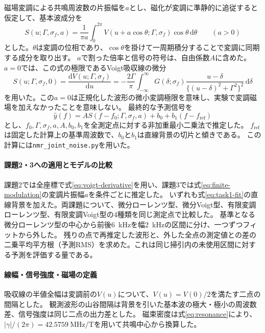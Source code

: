 \documentclass[dvipdfmx,a4paper,11pt]{jsarticle}
\begin{document}
磁場変調による共鳴周波数の片振幅を$a$とし、磁化が変調に準静的に追従すると仮定して、基本波成分を
\begin{equation}
 S(u;\Gamma,\sigma_f,a)=
 \frac{1}{\pi a}\int_0^{2\pi}
 V(u+a\cos\theta;\Gamma,\sigma_f)\cos\theta\,\mathrm{d}\theta
 \qquad (a>0)
 \label{eq:finite-modulation}
\end{equation}
とした。$\theta$は変調の位相であり、$\cos\theta$を掛けて一周期積分することで変調に同期する成分を取り出す。
$a$で割った倍率と信号の符号は、自由係数$A$に含めた。$a=0$では、この式の極限であるVoigt吸収線の微分
\begin{equation}
 S(u;\Gamma,\sigma_f,0)=\frac{\mathrm{d}V(u;\Gamma,\sigma_f)}{\mathrm{d}u}
 =-\frac{2\Gamma}{\pi}\int_{-\infty}^{\infty}
 G(\delta;\sigma_f)\frac{u-\delta}{\{(u-\delta)^2+\Gamma^2\}^2}\,\mathrm{d}\delta
 \label{eq:voigt-derivative}
\end{equation}
を用いた。この$a=0$は正規化した波形の微小変調極限を意味し、実験で変調磁場を加えなかったことを意味しない。
最終的な予測信号を
\begin{equation}
 \hat y(f)=A S(f-f_0;\Gamma,\sigma_f,a)+b_0+b_1(f-f_{\mathrm{ref}})
 \label{eq:task1-fit}
\end{equation}
とし、$f_0,\Gamma,\sigma_f,a,A,b_0,b_1$を全測定点に対する非加重最小二乗法で推定した。
$f_{\mathrm{ref}}$は固定した計算上の基準周波数で、$b_0$と$b_1$は直線背景の切片と傾きである。
この計算には\texttt{nmr\_joint\_noise.py}を用いた。

\paragraph{課題2・3への適用とモデルの比較}
課題2では全座標で式\eqref{eq:voigt-derivative}を用い、課題3では式\eqref{eq:finite-modulation}の変調片振幅$a$を条件ごとに推定した。
いずれも式\eqref{eq:task1-fit}の直線背景を加えた。両課題について、微分ローレンツ型、微分Voigt型、有限変調ローレンツ型、有限変調Voigt型の4種類を同じ測定点で比較した。
基準となる微分ローレンツ型の中心から前後\SI{6}{\kilo\hertz}を幅\SI{2}{\kilo\hertz}の区間に分け、一つずつフィットから外した。
残りの点で再推定した波形と、外した全点の測定値との差の二乗平均平方根（予測RMS）を求めた。これは同じ掃引内の未使用区間に対する予測を評価する量である。

\paragraph{線幅・信号強度・磁場の定義}
吸収線の半値全幅は変調前の$V(u)$について、$V(u)=V(0)/2$を満たす二点の間隔とした。
観測波形の山谷間隔は背景を引いた基本波の極大・極小の周波数差、信号強度は同じ二点の出力差とした。
磁束密度は式\eqref{eq:resonance}により、$|\gamma|/(2\pi)=\SI{42.5759}{\mega\hertz\per\tesla}$を用いて共鳴中心から換算した。
\end{document}
